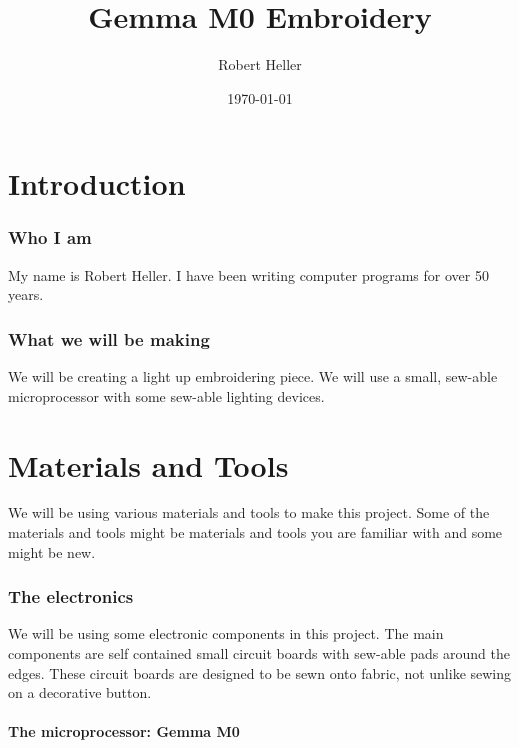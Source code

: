 \documentclass[letterpaper,twoside,12pt]{article}
\title{Gemma M0 Embroidery}
\author{Robert Heller}
\date{\today}
\begin{document}
\maketitle

\tableofcontents

\part{Introduction}
\section{Who I am}

My name is Robert Heller.  I have been writing computer programs for over 50
years.

\section{What we will be making}

We will be creating a light up embroidering piece.  We will use a small, 
sew-able microprocessor with some sew-able lighting devices.

\part{Materials and Tools}

We will be using various materials and tools to make this project.  Some of 
the materials and tools might be materials and tools you are familiar with and 
some might be new.

\section{The electronics}

We will be using some electronic components in this project.  The main 
components are self contained small circuit boards with sew-able pads around 
the edges.  These circuit boards are designed to be sewn onto fabric, not 
unlike sewing on a decorative button.

\subsection{The microprocessor: Gemma M0}
\end{document}
